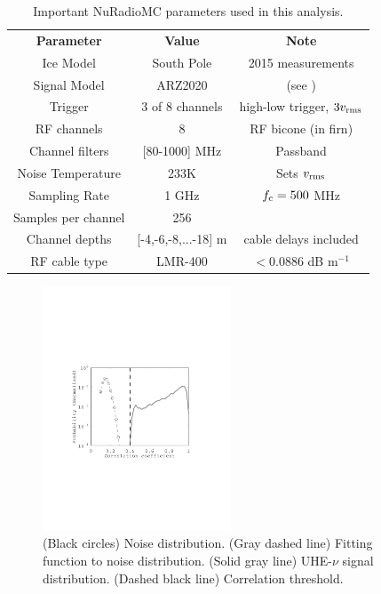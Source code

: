 \documentclass[amsmath,amssymb,aps,prd,10pt,twocolumn,showkeys]{revtex4}
\begin{document}
\begin{table}
\small
\centering
\begin{tabular}{| c | c | c |}
\hline
\textbf{Parameter} & \textbf{Value} & \textbf{Note} \\
Ice Model & South Pole & 2015 measurements \\
Signal Model & ARZ2020 & (see \cite{PhysRevD.101.083005}) \\
Trigger & 3 of 8 channels & high-low trigger, $3v_{\rm rms}$ \\
RF channels & 8 & RF bicone (in firn) \\
Channel filters & [80-1000] MHz & Passband \\
Noise Temperature & 233K & Sets $v_{\rm rms}$ \\
Sampling Rate & 1 GHz & $f_{\rm c} = 500$ MHz \\
Samples per channel & 256 &  \\
Channel depths & [-4,-6,-8,...-18] m & cable delays included \\
RF cable type & LMR-400 & $<0.0886$ dB m$^{-1}$ \\
\hline
\end{tabular}
\caption{\label{tab:1} Important NuRadioMC parameters used in this analysis.}
\end{table}

\begin{figure}
\centering
\includegraphics[width=0.5\textwidth,trim=3.25cm 8.25cm 4.5cm 9.0cm,clip=true]{Aug15_plot1.pdf}
\caption{\label{fig:fig3} (Black circles) Noise distribution. (Gray dashed line) Fitting function to noise distribution.  (Solid gray line) UHE-$\nu$ signal distribution.  (Dashed black line) Correlation threshold.}
\end{figure}
\end{document}
